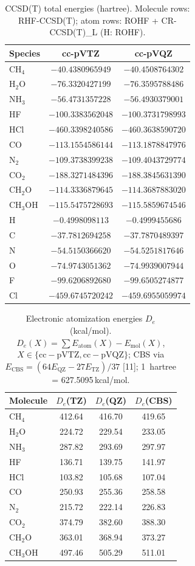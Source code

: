 \documentclass[preprint,12pt]{elsarticle}
\begin{document}
\begin{table}[h]
\centering
\caption{CCSD(T) total energies (hartree). Molecule rows: RHF-CCSD(T); atom rows: ROHF + CR-CCSD(T)\_L (H: ROHF).}\label{tab:a1}
\begin{tabular}{lcc}
\toprule
Species & cc-pVTZ & cc-pVQZ \\
\midrule
CH$_4$  & $-40.4380965949$ & $-40.4508764302$ \\
H$_2$O  & $-76.3320427199$ & $-76.3595788486$ \\
NH$_3$  & $-56.4731357228$ & $-56.4930379001$ \\
HF   & $-100.3383562048$ & $-100.3731798993$ \\
HCl  & $-460.3398240586$ & $-460.3638590720$ \\
CO   & $-113.1554586144$ & $-113.1878847976$ \\
N$_2$   & $-109.3738399238$ & $-109.4043729774$ \\
CO$_2$  & $-188.3271484396$ & $-188.3845631390$ \\
CH$_2$O & $-114.3336879645$ & $-114.3687883020$ \\
CH$_3$OH& $-115.5475728693$ & $-115.5859674546$ \\
H    & $-0.4998098113$ & $-0.4999455686$ \\
C    & $-37.7812694258$ & $-37.7870489397$ \\
N    & $-54.5150366620$ & $-54.5251817646$ \\
O    & $-74.9743051362$ & $-74.9939007944$ \\
F    & $-99.6206892680$ & $-99.6505274877$ \\
Cl   & $-459.6745720242$ & $-459.6955059974$ \\
\bottomrule
\end{tabular}
\end{table}

\begin{table}[h]
\centering
\caption{Electronic atomization energies $D_e$ (kcal/mol). $D_e(X)=\sum E_\mathrm{atom}(X)-E_\mathrm{mol}(X)$, $X\in\{\mathrm{cc-pVTZ},\mathrm{cc-pVQZ}\}$; CBS via $E_\mathrm{CBS}=(64 E_\mathrm{QZ}-27 E_\mathrm{TZ})/37$ [11]; 1~hartree = 627.5095\,kcal/mol.}\label{tab:a2}
\begin{tabular}{lccc}
\toprule
Molecule & $D_e$(TZ) & $D_e$(QZ) & $D_e$(CBS) \\
\midrule
CH$_4$  & 412.64 & 416.70 & 419.65 \\
H$_2$O  & 224.72 & 229.54 & 233.05 \\
NH$_3$  & 287.82 & 293.69 & 297.97 \\
HF   & 136.71 & 139.75 & 141.97 \\
HCl  & 103.82 & 105.68 & 107.04 \\
CO   & 250.93 & 255.36 & 258.58 \\
N$_2$   & 215.72 & 222.14 & 226.83 \\
CO$_2$  & 374.79 & 382.60 & 388.30 \\
CH$_2$O & 363.01 & 368.94 & 373.27 \\
CH$_3$OH& 497.46 & 505.29 & 511.01 \\
\bottomrule
\end{tabular}
\end{table}
\end{document}
